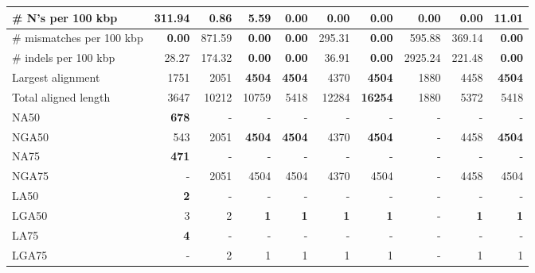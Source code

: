 \documentclass[12pt,a4paper]{article}
\begin{document}
\begin{table}[ht]
\begin{center}
\begin{tabular}{|l*{9}{|r}|}
\# N's per 100 kbp & 311.94 & 0.86 & 5.59 & {\bf 0.00} & {\bf 0.00} & {\bf 0.00} & {\bf 0.00} & {\bf 0.00} & 11.01 \\ \hline
\# mismatches per 100 kbp & {\bf 0.00} & 871.59 & {\bf 0.00} & {\bf 0.00} & 295.31 & {\bf 0.00} & 595.88 & 369.14 & {\bf 0.00} \\ \hline
\# indels per 100 kbp & 28.27 & 174.32 & {\bf 0.00} & {\bf 0.00} & 36.91 & {\bf 0.00} & 2925.24 & 221.48 & {\bf 0.00} \\ \hline
Largest alignment & 1751 & 2051 & {\bf 4504} & {\bf 4504} & 4370 & {\bf 4504} & 1880 & 4458 & {\bf 4504} \\ \hline
Total aligned length & 3647 & 10212 & 10759 & 5418 & 12284 & {\bf 16254} & 1880 & 5372 & 5418 \\ \hline
NA50 & {\bf 678} & - & - & - & - & - & - & - & - \\ \hline
NGA50 & 543 & 2051 & {\bf 4504} & {\bf 4504} & 4370 & {\bf 4504} & - & 4458 & {\bf 4504} \\ \hline
NA75 & {\bf 471} & - & - & - & - & - & - & - & - \\ \hline
NGA75 & - & 2051 & 4504 & 4504 & 4370 & 4504 & - & 4458 & 4504 \\ \hline
LA50 & {\bf 2} & - & - & - & - & - & - & - & - \\ \hline
LGA50 & 3 & 2 & {\bf 1} & {\bf 1} & {\bf 1} & {\bf 1} & - & {\bf 1} & {\bf 1} \\ \hline
LA75 & {\bf 4} & - & - & - & - & - & - & - & - \\ \hline
LGA75 & - & 2 & 1 & 1 & 1 & 1 & - & 1 & 1 \\ \hline
\end{tabular}
\end{center}
\end{table}
\end{document}
